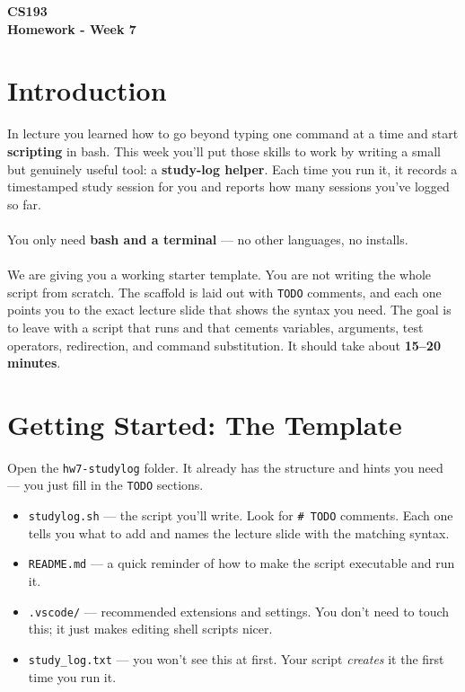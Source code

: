 \documentclass[11pt]{article}
\begin{document}
\begin{center}
    {\Huge \textbf{CS193}} \\
    \vspace{2mm}
    {\Large \textbf{Homework - Week 7}} \\
\end{center}

\section{Introduction}
In lecture you learned how to go beyond typing one command at a time and start \textbf{scripting} in bash. This week you'll put those skills to work by writing a small but genuinely useful tool: a \textbf{study-log helper}. Each time you run it, it records a timestamped study session for you and reports how many sessions you've logged so far.
\\\\
You only need \textbf{bash and a terminal} --- no other languages, no installs.
\\\\
We are giving you a working starter template. You are not writing the whole script from scratch. The scaffold is laid out with \texttt{TODO} comments, and each one points you to the exact lecture slide that shows the syntax you need. The goal is to leave with a script that runs and that cements variables, arguments, test operators, redirection, and command substitution. It should take about \textbf{15--20 minutes}.

\section{Getting Started: The Template}
Open the \texttt{hw7-studylog} folder. It already has the structure and hints you need --- you just fill in the \texttt{TODO} sections.
\begin{itemize}
    \item \texttt{studylog.sh} --- the script you'll write. Look for \texttt{\# TODO} comments. Each one tells you what to add and names the lecture slide with the matching syntax.
    \item \texttt{README.md} --- a quick reminder of how to make the script executable and run it.
    \item \texttt{.vscode/} --- recommended extensions and settings. You don't need to touch this; it just makes editing shell scripts nicer.
    \item \texttt{study\_log.txt} --- you won't see this at first. Your script \textit{creates} it the first time you run it.
\end{itemize}
\end{document}
